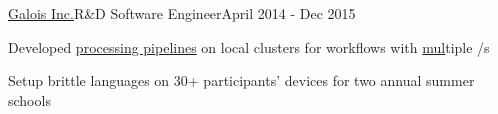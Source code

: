 \documentclass{article}
\def\PT{{\bf(Part Time)}\xspace}
\begin{document}

\begin{**mylist}[Security]{\href{http://galois.com}{Galois Inc.}}{R\&D Software Engineer}{April 2014 - Dec 2015}
\item Developed \href{https://github.com/probinso/ppaml-eval-tools}{processing pipelines} on local clusters for
   workflows with \href{https://www.darpa.mil/research/programs/probabilistic-programming-for-advancing-machine-Learning}{m}\href{https://galois.com/news/galois-awarded-10m-darpa-contract-make-legacy-systems-secure/}{u}\href{https://www.darpa.mil/program/safeware}{l}tiple /s
\item Setup brittle  languages on 30+ participants’ devices for two annual  summer schools

\end{**mylist}
\end{document}
